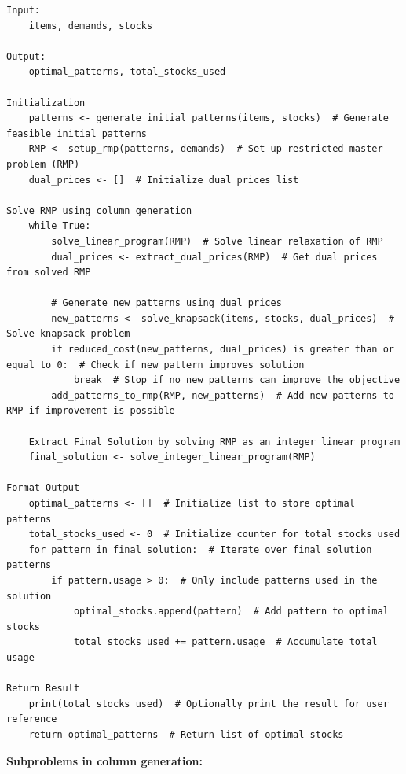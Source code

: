 \documentclass[a4paper]{article}
\begin{document}
\begin{verbatim}
Input:
    items, demands, stocks

Output:
    optimal_patterns, total_stocks_used

Initialization
    patterns <- generate_initial_patterns(items, stocks)  # Generate feasible initial patterns
    RMP <- setup_rmp(patterns, demands)  # Set up restricted master problem (RMP)
    dual_prices <- []  # Initialize dual prices list

Solve RMP using column generation
    while True:
        solve_linear_program(RMP)  # Solve linear relaxation of RMP
        dual_prices <- extract_dual_prices(RMP)  # Get dual prices from solved RMP
    
        # Generate new patterns using dual prices
        new_patterns <- solve_knapsack(items, stocks, dual_prices)  # Solve knapsack problem
        if reduced_cost(new_patterns, dual_prices) is greater than or equal to 0:  # Check if new pattern improves solution
            break  # Stop if no new patterns can improve the objective
        add_patterns_to_rmp(RMP, new_patterns)  # Add new patterns to RMP if improvement is possible
    
    Extract Final Solution by solving RMP as an integer linear program
    final_solution <- solve_integer_linear_program(RMP)

Format Output
    optimal_patterns <- []  # Initialize list to store optimal patterns
    total_stocks_used <- 0  # Initialize counter for total stocks used
    for pattern in final_solution:  # Iterate over final solution patterns
        if pattern.usage > 0:  # Only include patterns used in the solution
            optimal_stocks.append(pattern)  # Add pattern to optimal stocks
            total_stocks_used += pattern.usage  # Accumulate total usage

Return Result
    print(total_stocks_used)  # Optionally print the result for user reference
    return optimal_patterns  # Return list of optimal stocks
\end{verbatim}
\noindent\textbf{Subproblems in column generation:} 
\end{document}
